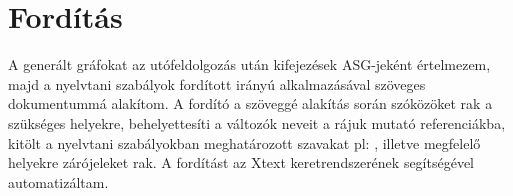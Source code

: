 \section{Fordítás}

A generált gráfokat az utófeldolgozás után kifejezések  ASG-jeként értelmezem, majd a nyelvtani szabályok fordított irányú alkalmazásával szöveges dokumentummá alakítom. A fordító a szöveggé alakítás során szóközöket rak a szükséges helyekre, behelyettesíti a változók neveit a rájuk mutató referenciákba,  kitölt a nyelvtani szabályokban meghatározott szavakat pl:  , illetve megfelelő helyekre  zárójeleket rak. A fordítást az Xtext keretrendszerének segítségével automatizáltam.

